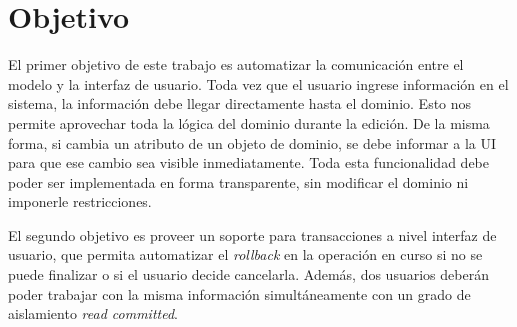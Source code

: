 \section{Objetivo}
\label{Objective}
El primer objetivo de este trabajo es automatizar la comunicación entre el
modelo y la interfaz de usuario.
Toda vez que el usuario ingrese información en el sistema, la
información debe llegar directamente hasta el dominio. Esto nos permite
aprovechar toda la lógica del dominio durante la edición.
De la misma forma, si cambia un atributo de un objeto de dominio, se debe
informar a la UI para que ese cambio sea visible
inmediatamente.
Toda esta funcionalidad debe poder ser implementada en forma transparente,
sin modificar el dominio ni imponerle restricciones.

El segundo objetivo es proveer un soporte para transacciones a nivel interfaz de usuario, 
que permita automatizar el \emph{rollback} en la operación en curso si no se puede
finalizar o si el usuario decide cancelarla.
Además, dos usuarios deberán poder trabajar con la misma información
simultáneamente con un grado de aislamiento \emph{read committed}.

